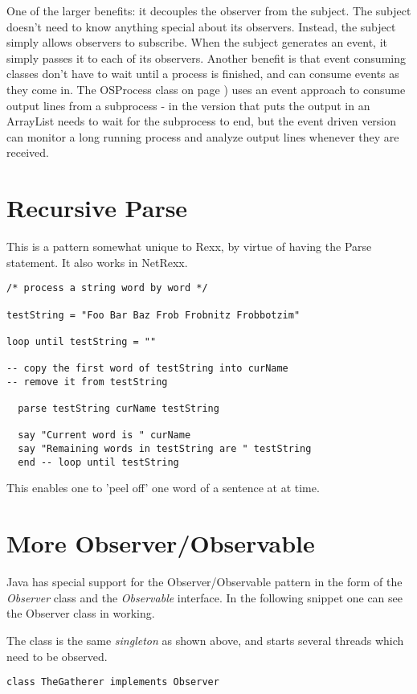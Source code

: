 {One of the larger benefits: it decouples the observer from the
subject. The subject doesn't need to know anything special about its
observers. Instead, the subject simply allows observers to
subscribe. When the subject generates an event, it simply passes it to
each of its observers. Another benefit is that event consuming classes
don't have to wait until a process is finished, and can consume events
as they come in. The OSProcess class on page
\pageref{outputeventlistener}) uses an event approach to consume
output lines from a subprocess - in the version that puts the output
in an ArrayList needs to wait for the subprocess to end, but the event
driven version can monitor a long running process and analyze output
lines whenever they are received.

\section{Recursive Parse}
This is a pattern somewhat unique to Rexx, by virtue of \Rexx{} having the Parse
statement. It also works in NetRexx.
\begin{lstlisting}
/* process a string word by word */

testString = "Foo Bar Baz Frob Frobnitz Frobbotzim"

loop until testString = ""

-- copy the first word of testString into curName
-- remove it from testString

  parse testString curName testString

  say "Current word is " curName
  say "Remaining words in testString are " testString
  end -- loop until testString
\end{lstlisting}
This enables one to 'peel off' one word of a sentence at at time.


\section{More Observer/Observable}

Java has special support for the Observer/Observable pattern in the
form of the \emph{Observer} class and the \emph{Observable} interface.
In the following snippet one can see the Observer class in working.

The class is the same \emph{singleton} as shown above, and starts several threads which need
to be observed.
\begin{lstlisting}[label=obs,caption=Observer]
class TheGatherer implements Observer 
\end{lstlisting}

}
